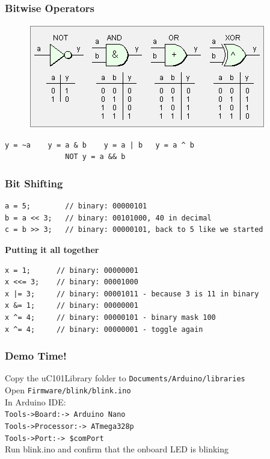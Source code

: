 \documentclass[t]{beamer}
\begin{document}
\begin{frame}[t,fragile]
\frametitle{Bitwise Operators}

\begin{figure}
	\includegraphics[scale=0.8]{truthTables.png}
\end{figure}

\begin{BVerbatim}[tabsize=4]
     y = ~a	   y = a & b 	y = a | b   y = a ^ b
              NOT y = a && b
\end{BVerbatim}

\end{frame}


\begin{frame}[t,fragile]
\frametitle{Bit Shifting}

\begin{BVerbatim}[tabsize=4]
a = 5;        // binary: 00000101
b = a << 3;   // binary: 00101000, 40 in decimal
c = b >> 3;   // binary: 00000101, back to 5 like we started
\end{BVerbatim}

\vspace*{10mm}
\textbf{Putting it all together}\\

\begin{BVerbatim}[tabsize=4]
x = 1;      // binary: 00000001
x <<= 3;    // binary: 00001000
x |= 3;     // binary: 00001011 - because 3 is 11 in binary
x &= 1;     // binary: 00000001
x ^= 4;     // binary: 00000101 - binary mask 100
x ^= 4;     // binary: 00000001 - toggle again
\end{BVerbatim}
\end{frame}


\begin{frame}[t]
\frametitle{Demo Time!}
Copy the uC101Library folder to \texttt{Documents/Arduino/libraries}\\
Open \texttt{Firmware/blink/blink.ino}\\
In Arduino IDE:\\
\texttt{Tools->Board:-> Arduino Nano}\\
\texttt{Tools->Processor:-> ATmega328p}\\
\texttt{Tools->Port:-> \$comPort}\\

Run blink.ino and confirm that the onboard LED is blinking


\end{frame}
\end{document}

